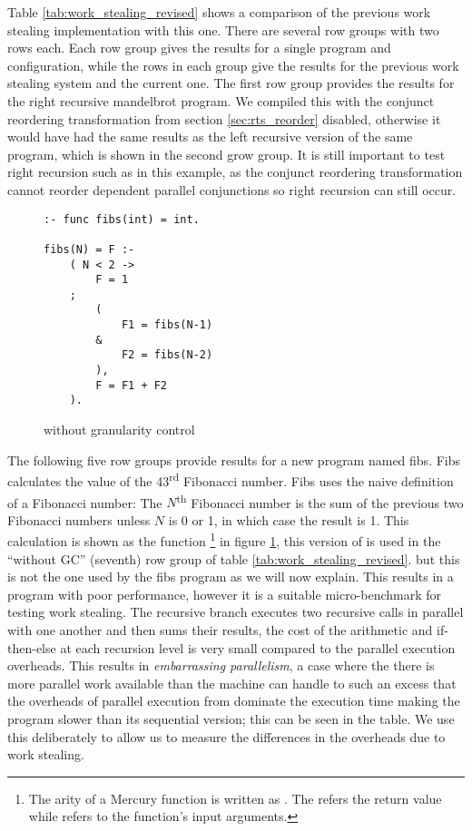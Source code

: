 

Table \ref{tab:work_stealing_revised} shows a comparison of the previous
work stealing implementation with this one.
There are several row groups with two rows each.
Each row group gives the results for a single program and configuration,
while the rows in each group give the results for the previous work stealing
system and the current one.
The first row group provides the results for the
right recursive mandelbrot program.
We compiled this with the conjunct reordering transformation from section
\ref{sec:rts_reorder} disabled,
otherwise it would have had the same results as the left recursive version
of the same program,
which is shown in the second grow group.
It is still important to test right recursion such as in this example,
as the conjunct reordering transformation cannot reorder dependent parallel
conjunctions so right recursion can still occur.

\begin{figure}
\begin{verbatim}
:- func fibs(int) = int.

fibs(N) = F :-
    ( N < 2 ->
        F = 1
    ;
        (
            F1 = fibs(N-1)
        &
            F2 = fibs(N-2)
        ),
        F = F1 + F2
    ).
\end{verbatim}
\caption{\fibs without granularity control}
\label{fig:fibs}
\end{figure}

The following five row groups provide results for a new program named fibs.
Fibs calculates the value of the 43\textsuperscript{rd} Fibonacci number.
Fibs uses the naive definition of a Fibonacci number:  The
$N$\textsuperscript{th} Fibonacci number is the sum of the previous two
Fibonacci numbers unless $N$ is 0 or 1, in which case the result is 1.
This calculation is shown as the function \fibs\footnote{
    The arity of a Mercury function is written as .
    The  refers the return value while  refers to the
    function's input arguments.}
in figure \ref{fig:fibs},
this version of \fibs is used in the ``without GC'' (seventh) row group of table
\ref{tab:work_stealing_revised}.
but this is not the one used by the fibs program as we will now explain.
This results in a program with poor performance,
however it is a suitable micro-benchmark for testing work stealing.
The recursive branch executes two recursive calls in parallel with one
another and then sums their results,
the cost of the arithmetic and if-then-else at each recursion level is very
small compared to the parallel execution overheads.
This results in \emph{embarrassing parallelism},
a case where the there is more parallel work available than the machine can
handle to such an excess that the overheads of parallel execution from
dominate the execution time
making the program slower than its sequential version;
this can be seen in the table.
We use this deliberately to allow us to measure the differences in the
overheads due to work stealing.

